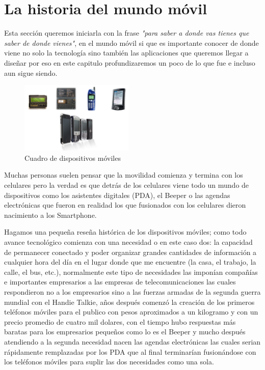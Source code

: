 \documentclass[11pt]{book}
\begin{document}
\section{La historia del mundo móvil}
Esta sección queremos iniciarla con la frase \textit{"para saber a donde vas tienes que saber de donde vienes"}, en el mundo móvil si que es importante conocer de donde viene no solo la tecnología sino también las aplicaciones que queremos llegar a diseñar por eso en este capitulo profundizaremos un poco de lo que fue e incluso aun sigue siendo.


\begin{figure}
  \vspace{-20pt}
  \begin{center}
    \includegraphics[width=0.48\textwidth]{historia_1}
  \end{center}
  \vspace{-20pt}
  \caption{Cuadro de dispositivos móviles}
  \label{fig:historia_1}
  \vspace{-10pt}
\end{figure}

Muchas personas suelen pensar que la movilidad comienza y termina con los celulares pero la verdad es que detrás de los celulares viene todo un mundo de dispositivos como los asistentes digitales (\gls{PDA}), el \gls{Beeper} o las agendas electrónicas que fueron en realidad los que fusionados con los celulares dieron nacimiento a los \gls{Smartphone}.

Hagamos una pequeña reseña histórica de los dispositivos móviles; como todo avance tecnológico comienza con una necesidad o en este caso dos: la capacidad de permanecer conectado y poder organizar grandes cantidades de información a cualquier hora del día en el lugar donde que me encuentre (la casa, el trabajo, la calle, el bus, etc.), normalmente este tipo de necesidades las imponían compañías e importantes empresarios a las empresas de telecomunicaciones las cuales respondieron no a los empresarios sino a las fuerzas armadas de la segunda guerra mundial con el \gls{Handie Talkie}, años después comenzó la creación de los primeros teléfonos móviles para el publico con pesos aproximados a un kilogramo y con un precio promedio de cuatro mil dolares, con el tiempo hubo respuestas más baratas para los empresarios pequeños como lo es el \gls{Beeper} y mucho después atendiendo a la segunda necesidad nacen las agendas electrónicas las cuales serian rápidamente remplazadas por los \gls{PDA} que al final terminarían fusionándose con los teléfonos móviles para suplir las dos necesidades como una sola.
\end{document}
